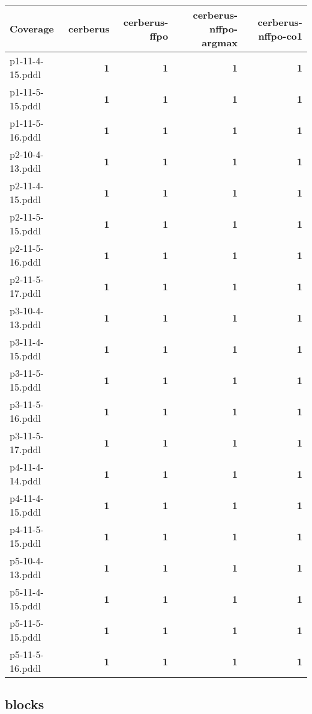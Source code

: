 \documentclass{article}
\begin{document}
\begin{tabular}{@{}lrrrr@{}}
Coverage & cerberus & cerberus-ffpo & cerberus-nffpo-argmax & cerberus-nffpo-co1 \\
\midrule
p1-11-4-15.pddl & \textbf{1} & \textbf{1} & \textbf{1} & \textbf{1} \\
p1-11-5-15.pddl & \textbf{1} & \textbf{1} & \textbf{1} & \textbf{1} \\
p1-11-5-16.pddl & \textbf{1} & \textbf{1} & \textbf{1} & \textbf{1} \\
p2-10-4-13.pddl & \textbf{1} & \textbf{1} & \textbf{1} & \textbf{1} \\
p2-11-4-15.pddl & \textbf{1} & \textbf{1} & \textbf{1} & \textbf{1} \\
p2-11-5-15.pddl & \textbf{1} & \textbf{1} & \textbf{1} & \textbf{1} \\
p2-11-5-16.pddl & \textbf{1} & \textbf{1} & \textbf{1} & \textbf{1} \\
p2-11-5-17.pddl & \textbf{1} & \textbf{1} & \textbf{1} & \textbf{1} \\
p3-10-4-13.pddl & \textbf{1} & \textbf{1} & \textbf{1} & \textbf{1} \\
p3-11-4-15.pddl & \textbf{1} & \textbf{1} & \textbf{1} & \textbf{1} \\
p3-11-5-15.pddl & \textbf{1} & \textbf{1} & \textbf{1} & \textbf{1} \\
p3-11-5-16.pddl & \textbf{1} & \textbf{1} & \textbf{1} & \textbf{1} \\
p3-11-5-17.pddl & \textbf{1} & \textbf{1} & \textbf{1} & \textbf{1} \\
p4-11-4-14.pddl & \textbf{1} & \textbf{1} & \textbf{1} & \textbf{1} \\
p4-11-4-15.pddl & \textbf{1} & \textbf{1} & \textbf{1} & \textbf{1} \\
p4-11-5-15.pddl & \textbf{1} & \textbf{1} & \textbf{1} & \textbf{1} \\
p5-10-4-13.pddl & \textbf{1} & \textbf{1} & \textbf{1} & \textbf{1} \\
p5-11-4-15.pddl & \textbf{1} & \textbf{1} & \textbf{1} & \textbf{1} \\
p5-11-5-15.pddl & \textbf{1} & \textbf{1} & \textbf{1} & \textbf{1} \\
p5-11-5-16.pddl & \textbf{1} & \textbf{1} & \textbf{1} & \textbf{1} \\
\end{tabular}

\hypertarget{coverage-blocks}{}
\subsection*{blocks}
\end{document}
